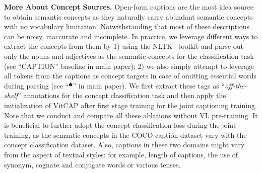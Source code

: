 \vspace{1mm}
\noindent\textbf{More About Concept Sources.}
Open-form captions are the most idea source to obtain semantic concepts as they naturally carry abundant semantic concepts with no vocabulary limitation. Notwithstanding that most of these descriptions can be noisy, inaccurate and incomplete. In practice, we leverage different ways to extract the concepts from them by 1) using the NLTK~\citep{loper2002nltk} toolkit and parse out only the nouns and adjectives as the semantic concepts for the classification task (see ``CAPTION'' baseline in main paper); 2) we also simply attempt to leverage all tokens from the captions as concept targets in case of omitting essential words during parsing (see ``$^{\spadesuit}$'' in main paper).
We first extract these tags as ``\textit{off-the-shelf}'' annotations for the concept classification task and then apply the initialization of VitCAP after first stage training for the joint captioning training. Note that we conduct and compare all these ablations without VL pre-training. It is beneficial to further adopt the concept classification loss during the joint training, as the semantic concepts in the COCO-caption dataset vary with the concept classification dataset. Also, captions in these two domains might vary from the aspect of textual styles: for example, length of captions, the use of synonym, cognate and conjugate words or various tenses.



